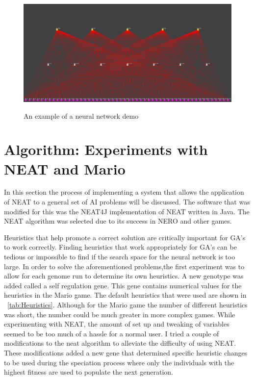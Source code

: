 \documentclass[12pt]{ucthesis} \newif\ifpdf \ifx\pdfoutput\undefined
\begin{document}
\begin{figure}[h!]
  \caption{An example of a neural network demo}
  \centering
    \includegraphics[width=1\textwidth]{simplemarionet.png}
   \label{fig:simplemarionet} 
\end{figure}


\chapter{Algorithm: Experiments with NEAT and Mario}


In this section the process of implementing a system that allows the
application of NEAT to a general set of AI problems will be discussed. The
software that was modified for this was the NEAT4J implementation of NEAT
written in Java. The NEAT algorithm was selected due to its success in NERO and
other games.

Heuristics that help promote a correct solution are critically important for
GA’s to work correctly. Finding heuristics that work appropriately for GA’s can be
tedious or impossible to find if the search space for the neural network is too
large.
In order to solve the aforementioned problems,the first experiment was to allow
for each genome run to determine its own heuristics. A new genotype was added
called a self regulation gene. This gene contains numerical values for the
heuristics in the Mario game. The default heuristics that were used are shown in
~\ref{tab:Heuristics}. Although for the Mario game the number of different
heuristics was short, the number could be much greater in more complex games.
While experimenting with NEAT, the amount of set up and tweaking of variables seemed to be too much of a hassle
for a normal user.  I tried a couple of modifications to the neat algorithm to alleviate the difficulty of using NEAT.  These modifications added a new
gene that determined specific heuristic changes to be used during the speciation
process where only the individuals with the highest fitness are used to populate
the next generation.
\end{document}
